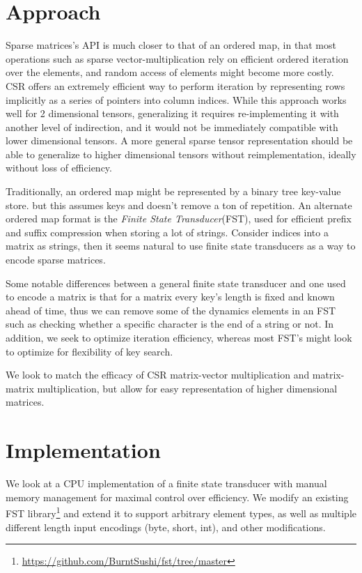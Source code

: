\documentclass[12pt]{article}
\begin{document}
\section*{Approach}

Sparse matrices's API is much closer to that of an ordered map, in that most operations
such as sparse vector-multiplication rely on efficient ordered iteration over the elements, and
random access of elements might become more costly. CSR offers an extremely efficient way to
perform iteration by representing rows implicitly as a series of pointers into column indices.
While this approach works well for 2 dimensional tensors, generalizing it requires
re-implementing it with another level of indirection, and it would not be immediately compatible
with lower dimensional tensors. A more general sparse tensor representation should be able to
generalize to higher dimensional tensors without reimplementation, ideally without loss of
efficiency.

Traditionally, an ordered map might be represented by a binary tree key-value store. but this
assumes keys and doesn't remove a ton of repetition. An alternate ordered map format is the
\textit{Finite State Transducer}(FST), used for efficient prefix and suffix compression when storing a lot of
strings. Consider indices into a matrix as strings, then it seems natural to use finite state
transducers as a way to encode sparse matrices.

Some notable differences between a general finite state transducer and one used to encode a
matrix is that for a matrix every key's length is fixed and known ahead of time, thus we can
remove some of the dynamics elements in an FST such as checking whether a specific character is
the end of a string or not. In addition, we seek to optimize iteration efficiency, whereas most
FST's might look to optimize for flexibility of key search.

We look to match the efficacy of CSR matrix-vector multiplication and matrix-matrix
multiplication, but allow for easy representation of higher dimensional matrices.

\section*{Implementation}

We look at a CPU implementation of a finite state transducer with manual memory management for
maximal control over efficiency. We modify an existing FST
library\footnote{\url{https://github.com/BurntSushi/fst/tree/master}} and extend it to support
arbitrary element types, as well as multiple different length input encodings (byte, short,
int), and other modifications.
\end{document}
